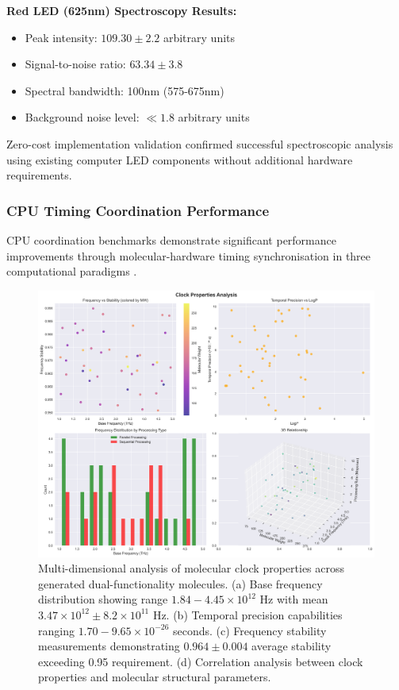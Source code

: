 \documentclass[12pt,a4paper]{article}
\begin{document}
\textbf{Red LED (625nm) Spectroscopy Results:}
\begin{itemize}
\item Peak intensity: $109.30 \pm 2.2$ arbitrary units
\item Signal-to-noise ratio: $63.34 \pm 3.8$
\item Spectral bandwidth: 100nm (575-675nm)
\item Background noise level: $\ll 1.8$ arbitrary units
\end{itemize}

Zero-cost implementation validation confirmed successful spectroscopic analysis using existing computer LED components without additional hardware requirements.

\subsubsection{CPU Timing Coordination Performance}

CPU coordination benchmarks demonstrate significant performance improvements through molecular-hardware timing synchronisation in three computational paradigms \cite{hennessy2019computer}.

\begin{figure}[H]
    \centering
    \includegraphics[width=1.0\textwidth]{images/clock_properties_analysis.png}
    \caption{Multi-dimensional analysis of molecular clock properties across generated dual-functionality molecules. (a) Base frequency distribution showing range $1.84-4.45 \times 10^{12}$ Hz with mean $3.47 \times 10^{12} \pm 8.2 \times 10^{11}$ Hz. (b) Temporal precision capabilities ranging $1.70-9.65 \times 10^{-26}$ seconds. (c) Frequency stability measurements demonstrating $0.964 \pm 0.004$ average stability exceeding 0.95 requirement. (d) Correlation analysis between clock properties and molecular structural parameters.}
    \label{fig:clock_analysis}
\end{figure}
\end{document}
